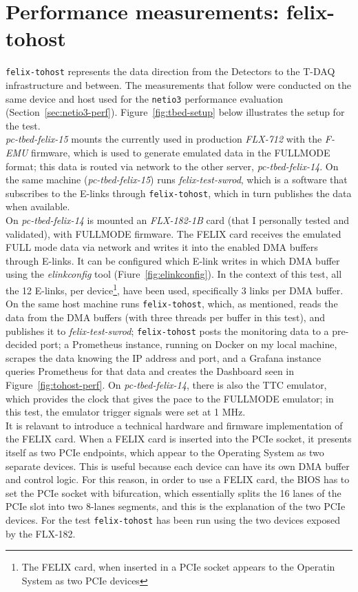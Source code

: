 \section{Performance measurements: felix-tohost}

\texttt{felix-tohost} represents the data direction from the Detectors to the T-DAQ infrastructure and between. The measurements that follow were conducted on the same device and host used for the \texttt{netio3} performance evaluation (Section~\ref{sec:netio3-perf}). 
Figure~\ref{fig:tbed-setup} below illustrates the setup for the test.\\
\emph{pc-tbed-felix-15} mounts the currently used in production \emph{FLX-712} with the \emph{F-EMU} firmware, which is used to generate emulated data in the FULLMODE format; this data is routed via network to the other server, \emph{pc-tbed-felix-14}.
On the same machine (\emph{pc-tbed-felix-15}) runs \emph{felix-test-swrod}, which is a software that subscribes to the \acs{E-link}s through \texttt{felix-tohost}, which in turn publishes the data when available.\\
On \emph{pc-tbed-felix-14} is mounted an \emph{FLX-182-1B} card (that I personally tested and validated), with FULLMODE firmware. The \acs{FELIX} card receives the emulated FULL mode data via network and writes it into the enabled \acs{DMA} buffers through \acs{E-link}s. It can be configured which \acs{E-link} writes in which \acs{DMA} buffer using the \emph{elinkconfig} tool (Fiure~\ref{fig:elinkconfig}). In the context of this test, all the 12 \acs{E-link}s, per device\footnote{The FELIX card, when inserted in a PCIe socket appears to the Operatin System as two PCIe devices}, have been used, specifically 3 links per \acs{DMA} buffer. On the same host machine runs \texttt{felix-tohost}, which, as mentioned, reads the data from the \acs{DMA} buffers (with three threads per buffer in this test), and publishes it to \emph{felix-test-swrod}; \texttt{felix-tohost} posts the monitoring data to a pre-decided port; a Prometheus instance, running on Docker on my local machine, scrapes the data knowing the IP address and port, and a Grafana instance queries Prometheus for that data and creates the Dashboard seen in Figure~\ref{fig:tohost-perf}. On \emph{pc-tbed-felix-14}, there is also the \acl{TTC} emulator, which provides the clock that gives the pace to the FULLMODE emulator; in this test, the emulator trigger signals were set at 1 MHz.\\
It is relavant to introduce a technical hardware and firmware implementation of the \acs{FELIX} card. When a \acs{FELIX} card is inserted into the \acs{PCIe} socket, it presents itself as two \acs{PCIe} endpoints, which appear to the Operating System as two separate devices. This is useful because each device can have its own \acs{DMA} buffer and control logic. For this reason, in order to use a \acs{FELIX} card, the BIOS has to set the \acs{PCIe} socket with bifurcation, which essentially splits the 16 lanes of the \acs{PCIe} slot into two 8-lanes segments, and this is the explanation of the two \acs{PCIe} devices. For the test \texttt{felix-tohost} has been run using the two devices exposed by the FLX-182.\\
